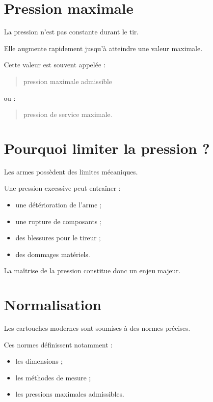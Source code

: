 \section{Pression maximale}

La pression n'est pas constante durant le tir.

Elle augmente rapidement jusqu'à atteindre une valeur maximale.

Cette valeur est souvent appelée :

\begin{quote}
pression maximale admissible
\end{quote}

ou :

\begin{quote}
pression de service maximale.
\end{quote}

\section{Pourquoi limiter la pression ?}

Les armes possèdent des limites mécaniques.

Une pression excessive peut entraîner :

\begin{itemize}
    \item une détérioration de l'arme ;
    \item une rupture de composants ;
    \item des blessures pour le tireur ;
    \item des dommages matériels.
\end{itemize}

La maîtrise de la pression constitue donc un enjeu majeur.

\section{Normalisation}

Les cartouches modernes sont soumises à des normes précises.

Ces normes définissent notamment :

\begin{itemize}
    \item les dimensions ;
    \item les méthodes de mesure ;
    \item les pressions maximales admissibles.
\end{itemize}

